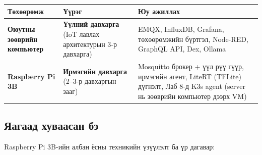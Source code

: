 \begingroup\scriptsize\begin{longtable}[]{@{}lll@{}}
\toprule
\begin{minipage}[b]{0.30\columnwidth}\raggedright
Төхөөрөмж\strut
\end{minipage} & \begin{minipage}[b]{0.30\columnwidth}\raggedright
Үүрэг\strut
\end{minipage} & \begin{minipage}[b]{0.30\columnwidth}\raggedright
Юу ажиллах\strut
\end{minipage}\tabularnewline
\midrule
\endhead
\begin{minipage}[t]{0.30\columnwidth}\raggedright
\textbf{Оюутны зөөврийн компьютер}\strut
\end{minipage} & \begin{minipage}[t]{0.30\columnwidth}\raggedright
\textbf{Үүлний давхарга} (IoT лавлах архитектурын 3-р давхарга)\strut
\end{minipage} & \begin{minipage}[t]{0.30\columnwidth}\raggedright
EMQX, InfluxDB, Grafana, төхөөрөмжийн бүртгэл, Node-RED, GraphQL API, Dex, Ollama\strut
\end{minipage}\tabularnewline
\begin{minipage}[t]{0.30\columnwidth}\raggedright
\textbf{Raspberry Pi 3B}\strut
\end{minipage} & \begin{minipage}[t]{0.30\columnwidth}\raggedright
\textbf{Ирмэгийн давхарга} (2--3-р давхаргын зааг)\strut
\end{minipage} & \begin{minipage}[t]{0.30\columnwidth}\raggedright
Mosquitto брокер + үүл рүү гүүр, ирмэгийн агент, LiteRT (TFLite) дүгнэлт, Лаб 8-д K3s agent (server нь зөөврийн компьютер дээрх VM)\strut
\end{minipage}\tabularnewline
\bottomrule
\end{longtable}\endgroup

\hypertarget{ux44fux430ux433ux430ux430ux434-ux445ux443ux432ux430ux430ux441ux430ux43d-ux431ux44d}{%
\subsection{Яагаад хуваасан бэ}\label{ux44fux430ux433ux430ux430ux434-ux445ux443ux432ux430ux430ux441ux430ux43d-ux431ux44d}}

Raspberry Pi 3B-ийн албан ёсны техникийн үзүүлэлт ба үр дагавар:

